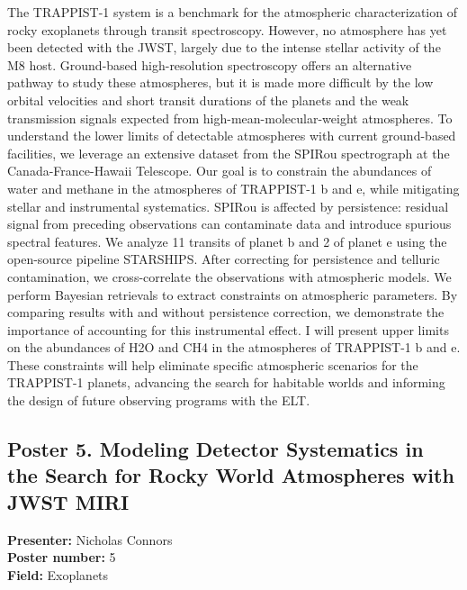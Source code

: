 The TRAPPIST-1 system is a benchmark for the atmospheric characterization of rocky exoplanets through transit spectroscopy. However, no atmosphere has yet been detected with the JWST, largely due to the intense stellar activity of the M8 host. Ground-based high-resolution spectroscopy offers an alternative pathway to study these atmospheres, but it is made more difficult by the low orbital velocities and short transit durations of the planets and the weak transmission signals expected from high-mean-molecular-weight atmospheres. To understand the lower limits of detectable atmospheres with current ground-based facilities, we leverage an extensive dataset from the SPIRou spectrograph at the Canada-France-Hawaii Telescope. Our goal is to constrain the abundances of water and methane in the atmospheres of TRAPPIST-1 b and e, while mitigating stellar and instrumental systematics. SPIRou is affected by persistence: residual signal from preceding observations can contaminate data and introduce spurious spectral features. We analyze 11 transits of planet b and 2 of planet e using the open-source pipeline STARSHIPS. After correcting for persistence and telluric contamination, we cross-correlate the observations with atmospheric models. We perform Bayesian retrievals to extract constraints on atmospheric parameters. By comparing results with and without persistence correction, we demonstrate the importance of accounting for this instrumental effect. I will present upper limits on the abundances of H2O and CH4 in the atmospheres of TRAPPIST-1 b and e. These constraints will help eliminate specific atmospheric scenarios for the TRAPPIST-1 planets, advancing the search for habitable worlds and informing the design of future observing programs with the ELT.

\hypertarget{poster-abstract-talk-312}{}\label{poster-abstract-page-talk-312}
\subsection*{Poster 5. Modeling Detector Systematics in the Search for Rocky World Atmospheres with JWST MIRI}
\textbf{Presenter:} Nicholas Connors\\
\textbf{Poster number:} 5\\
\textbf{Field:} Exoplanets

